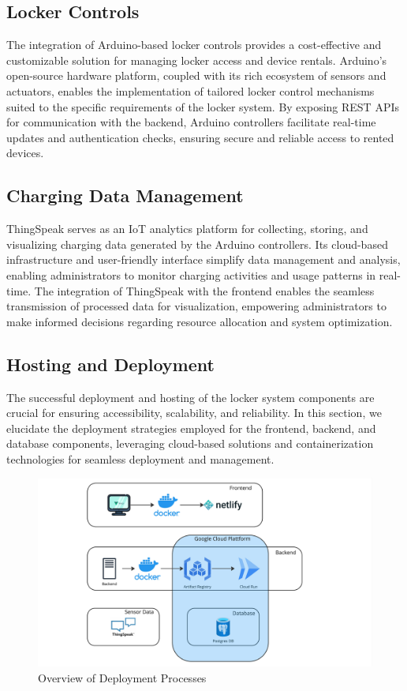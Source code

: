 \subsection{Locker Controls}

The integration of Arduino-based locker controls provides a cost-effective and
customizable solution for managing locker access and device rentals. Arduino's open-source
hardware platform, coupled with its rich ecosystem of sensors and actuators, enables the
implementation of tailored locker control mechanisms suited to the specific requirements of
the locker system. By exposing REST APIs for communication with the backend, Arduino controllers
facilitate real-time updates and authentication checks, ensuring secure and reliable access to
rented devices.

\subsection{Charging Data Management}

ThingSpeak serves as an IoT analytics platform for collecting, storing, and visualizing
charging data generated by the Arduino controllers. Its cloud-based infrastructure and
user-friendly interface simplify data management and analysis, enabling administrators to
monitor charging activities and usage patterns in real-time. The integration of ThingSpeak
with the frontend enables the seamless transmission of processed data for visualization,
empowering administrators to make informed decisions regarding resource allocation and system
optimization.

\subsection{Hosting and Deployment}

The successful deployment and hosting of the locker system components are crucial for ensuring accessibility, scalability, and reliability. In this section, we elucidate the deployment strategies employed for the frontend, backend, and database components, leveraging cloud-based solutions and containerization technologies for seamless deployment and management.

\begin{figure}[h]
    \centering
    \includegraphics[width=\textwidth]{images/software_design_deployment}
    \caption{Overview of Deployment Processes}
    \label{fig:deployment_overview}
\end{figure}

